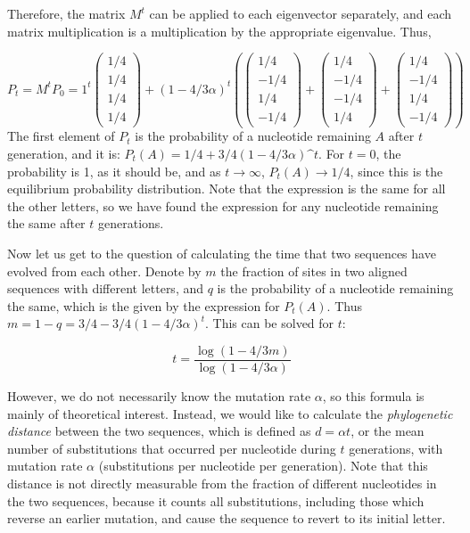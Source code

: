 \documentclass[
  letterpaper,
  DIV=11,
  numbers=noendperiod]{scrreprt}
\begin{document}
Therefore, the matrix \(M^t\) can be applied to each eigenvector
separately, and each matrix multiplication is a multiplication by the
appropriate eigenvalue. Thus,

\[ 
P_t = M^t P_0 =   1^t \left(\begin{array}{c} 1/4 \\ 1/4 \\ 1/4 \\ 1/4 \end{array}\right) + (1-4/3\alpha)^t\left( \left(\begin{array}{c} 1/4 \\ -1/4 \\ 1/4 \\ -1/4 \end{array}\right) +  \left(\begin{array}{c} 1/4 \\ -1/4 \\ -1/4 \\ 1/4 \end{array}\right) + \left(\begin{array}{c} 1/4 \\ -1/4 \\ 1/4 \\ -1/4 \end{array}\right) \right)
\] The first element of \(P_t\) is the probability of a nucleotide
remaining \(A\) after \(t\) generation, and it is:
\(P_t (A ) = 1/4 +3/4(1-4/3\alpha)\^t\). For \(t=0\), the probability is
1, as it should be, and as \(t \rightarrow \infty\),
\(P_t (A) \rightarrow 1/4\), since this is the equilibrium probability
distribution. Note that the expression is the same for all the other
letters, so we have found the expression for any nucleotide remaining
the same after \(t\) generations.

Now let us get to the question of calculating the time that two
sequences have evolved from each other. Denote by \(m\) the fraction of
sites in two aligned sequences with different letters, and \(q\) is the
probability of a nucleotide remaining the same, which is the given by
the expression for \(P_t(A)\). Thus
\(m = 1 - q = 3/4 - 3/4(1-4/3\alpha)^t\). This can be solved for \(t\):

\[ 
t = \frac{\log (1 - 4/3 m)}{\log (1 -4/3 \alpha)}
\]

However, we do not necessarily know the mutation rate \(\alpha\), so
this formula is mainly of theoretical interest. Instead, we would like
to calculate the \emph{phylogenetic distance} between the two sequences,
which is defined as \(d = \alpha t\), or the mean number of
substitutions that occurred per nucleotide during \(t\) generations,
with mutation rate \(\alpha\) (substitutions per nucleotide per
generation). Note that this distance is not directly measurable from the
fraction of different nucleotides in the two sequences, because it
counts all substitutions, including those which reverse an earlier
mutation, and cause the sequence to revert to its initial letter.
\end{document}
